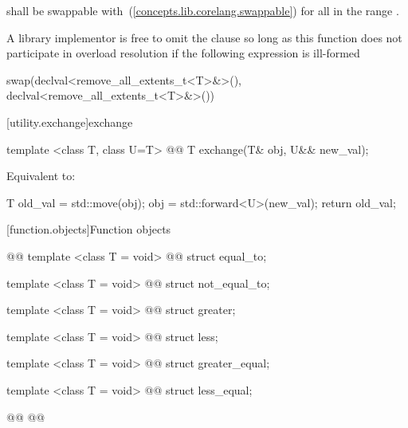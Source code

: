 \begin{itemdescr}
\pnum
\requires
{} shall be swappable with~(\ref{concepts.lib.corelang.swappable}) 
for all  in the range .

{\color{newclr}
\pnum
\remark
A library implementor is free to omit the  clause so long as
this function does not participate in overload resolution if the following
expression is ill-formed
\begin{codeblock}
swap(declval<remove_all_extents_t<T>&>(), declval<remove_all_extents_t<T>&>())
\end{codeblock}
}

\pnum
\effects {}
\end{itemdescr}

[utility.exchange]{exchange}

\begin{itemdecl}
template <class T, class U=T>
  @@
T exchange(T& obj, U&& new_val);
\end{itemdecl}

\begin{itemdescr}
\pnum
\effects
Equivalent to:

\begin{codeblock}
T old_val = std::move(obj);
obj = std::forward<U>(new_val);
return old_val;
\end{codeblock}
\end{itemdescr}

\setcounter{section}{8}
[function.objects]{Function objects}

\setcounter{Paras}{1}
\pnum
{}

\begin{codeblock}
@@
  template <class T = void>
    @@
  struct equal_to;
  
  template <class T = void>
    @@
  struct not_equal_to;
  
  template <class T = void>
    @@
  struct greater;
  
  template <class T = void>
    @@
  struct less;
  
  template <class T = void>
    @@
  struct greater_equal;
  
  template <class T = void>
    @@
  struct less_equal;
  
  @@
@\newtxt{\}\}\}}@
\end{codeblock}

